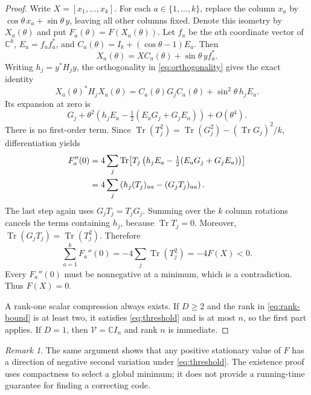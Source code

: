 \documentclass[11pt]{article}
\newcommand{\C}{\mathbb C}
\newcommand{\V}{\mathcal V}
\DeclareMathOperator{\Tr}{Tr}
\theoremstyle{remark}
\newtheorem{remark}[theorem]{Remark}
\numberwithin{equation}{section}
\begin{document}
\begin{proof}
Write $X=[x_1,\ldots,x_k]$. For each $a\in\{1,\ldots,k\}$, replace
the column $x_a$ by $\cos\theta\,x_a+\sin\theta\,y$, leaving all
other columns fixed. Denote this isometry by $X_a(\theta)$ and put
$F_a(\theta)=F(X_a(\theta))$. Let $f_a$ be the $a$th coordinate vector
of $\C^k$, $E_a=f_af_a^*$, and
$C_a(\theta)=I_k+(\cos\theta-1)E_a$. Then
\[
 X_a(\theta)=XC_a(\theta)+\sin\theta\,yf_a^*.
\]
Writing $h_j=y^*H_jy$, the orthogonality in
\eqref{eq:orthogonality} gives the exact identity
\begin{equation}\label{eq:rotation-exact}
 X_a(\theta)^*H_jX_a(\theta)
 =C_a(\theta)G_jC_a(\theta)+\sin^2\theta\,h_jE_a.
\end{equation}
Its expansion at zero is
\begin{equation}\label{eq:rotation-expansion}
 G_j+\theta^2\left(h_jE_a-\tfrac12(E_aG_j+G_jE_a)\right)
 +O(\theta^4).
\end{equation}
There is no first-order term. Since
$\Tr(T_j^2)=\Tr(G_j^2)-(\Tr G_j)^2/k$, differentiation yields
\begin{align}
 F_a''(0)
 &=4\sum_j\Tr\!\left[T_j
 \left(h_jE_a-\tfrac12(E_aG_j+G_jE_a)\right)\right]\notag\\
 &=4\sum_j\left(h_j(T_j)_{aa}-(G_jT_j)_{aa}\right).
 \label{eq:second-variation}
\end{align}
The last step again uses $G_jT_j=T_jG_j$. Summing over the $k$ column
rotations cancels the terms containing $h_j$, because $\Tr T_j=0$.
Moreover, $\Tr(G_jT_j)=\Tr(T_j^2)$. Therefore
\begin{equation}\label{eq:negative-sum}
 \sum_{a=1}^kF_a''(0)
 =-4\sum_j\Tr(T_j^2)=-4F(X)<0.
\end{equation}
Every $F_a''(0)$ must be nonnegative at a minimum, which is a
contradiction. Thus $F(X)=0$.

A rank-one scalar compression always exists. If $D\ge2$ and the rank
in \eqref{eq:rank-bound} is at least two, it satisfies
\eqref{eq:threshold} and is at most $n$, so the first part applies.
If $D=1$, then $\V=\C I_n$ and rank $n$ is immediate.
\end{proof}

\begin{remark}
The same argument shows that any positive stationary value of $F$ has
a direction of negative second variation under \eqref{eq:threshold}.
The existence proof uses compactness to select a global minimum; it
does not provide a running-time guarantee for finding a correcting code.
\end{remark}
\end{document}
